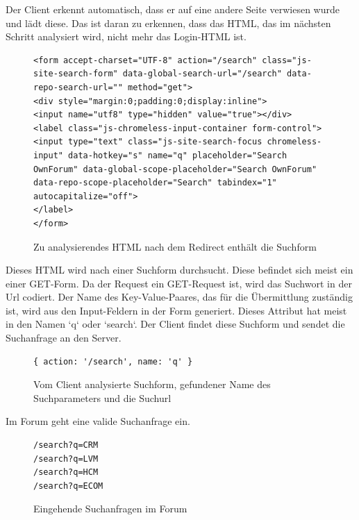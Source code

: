 Der Client erkennt automatisch, dass er auf eine andere Seite verwiesen wurde und lädt diese. Das ist daran zu erkennen, dass das HTML, das im nächsten Schritt analysiert wird, nicht mehr das Login-HTML ist.

\begin{figure}[h!]
\begin{lstlisting}[language=HTML5]
<form accept-charset="UTF-8" action="/search" class="js-site-search-form" data-global-search-url="/search" data-repo-search-url="" method="get">
<div style="margin:0;padding:0;display:inline">
<input name="utf8" type="hidden" value="true"></div>
<label class="js-chromeless-input-container form-control">
<input type="text" class="js-site-search-focus chromeless-input" data-hotkey="s" name="q" placeholder="Search OwnForum" data-global-scope-placeholder="Search OwnForum" data-repo-scope-placeholder="Search" tabindex="1" autocapitalize="off">
</label>
</form>
\end{lstlisting}
\caption{Zu analysierendes HTML nach dem Redirect enthält die Suchform}
\end{figure}

Dieses HTML wird nach einer Suchform durchsucht. Diese befindet sich meist ein einer GET-Form. Da der Request ein GET-Request ist, wird das Suchwort in der Url codiert. Der Name des Key-Value-Paares, das für die Übermittlung zuständig ist, wird aus den Input-Feldern in der Form generiert. Dieses Attribut hat meist in den Namen `q` oder `search`. Der Client findet diese Suchform und sendet die Suchanfrage an den Server.


\begin{figure}[ht]
\begin{lstlisting}[language=HTML5]
{ action: '/search', name: 'q' }
\end{lstlisting}
\caption{Vom Client analysierte Suchform, gefundener Name des Suchparameters und die Suchurl}
\end{figure}

Im Forum geht eine valide Suchanfrage ein.


\begin{figure}[ht]
\begin{lstlisting}[language=HTML5]
/search?q=CRM
/search?q=LVM
/search?q=HCM
/search?q=ECOM
\end{lstlisting}
\caption{Eingehende Suchanfragen im Forum }
\end{figure}

